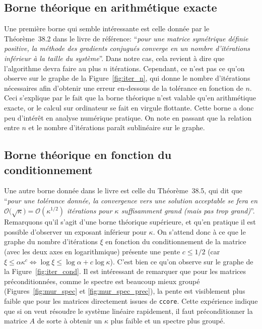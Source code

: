 \documentclass[11pt]{article}
\begin{document}
\subsection{Borne théorique en arithmétique exacte}
\label{sec:theo}
Une première borne qui semble intéressante est celle donnée par le Théorème~38.2 dans le livre de référence: \foreignquote{french}{\emph{pour une matrice symétrique définie positive, la méthode des gradients conjugués converge en un nombre d'itérations inférieur à la taille du système}}. Dans notre cas, cela revient à dire que l'algorithme devra faire au plus $n$ itérations. Cependant, ce n'est pas ce qu'on observe sur le graphe de la Figure~\ref{fig:iter_n}, qui donne le nombre d'itérations nécessaires afin d'obtenir une erreur en-dessous de la tolérance en fonction de $n$. Ceci s'explique par le fait que la borne théorique n'est valable qu'en arithmétique exacte, or le calcul sur ordinateur se fait en virgule flottante. Cette borne a donc peu d'intérêt en analyse numérique pratique. On note en passant que la relation entre $n$ et le nombre d'itérations paraît sublinéaire sur le graphe.

\subsection{Borne théorique en fonction du conditionnement}
Une autre borne donnée dans le livre est celle du Théorème~38.5, qui dit que \foreignquote{french}{\emph{pour une tolérance donnée, la convergence vers une solution acceptable se fera en $\mathcal{O}\big(\sqrt{\kappa}\big) = \mathcal{O}(\kappa^{1/2})$ itérations pour $\kappa$ suffisamment grand (mais pas trop grand)}}. Remarquons qu'il s'agit d'une borne théorique supérieure, et qu'en pratique il est possible d'observer un exposant inférieur pour $\kappa$. On s'attend donc à ce que le graphe du nombre d'itérations $\xi$ en fonction du conditionnement de la matrice (avec les deux axes en logarithmique) présente une pente $c \le 1/2$ (car $\xi \le \alpha \kappa^{c} \iff \log \xi \le \log \alpha + c \log \kappa$). C'est bien ce qu'on observe sur le graphe de la Figure~\ref{fig:iter_cond}. Il est intéressant de remarquer que pour les matrices préconditionnées, comme le spectre est beaucoup mieux groupé (Figures~\ref{fig:mur_spec} et \ref{fig:mur_spec_prec}), la pente est visiblement plus faible que pour les matrices directement issues de \texttt{ccore}. Cette expérience indique que si on veut résoudre le système linéaire rapidement, il faut préconditionner la matrice $A$ de sorte à obtenir un $\kappa$ plus faible et un spectre plus groupé.
\end{document}
